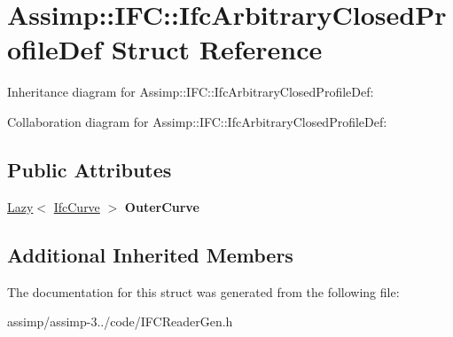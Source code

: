 \hypertarget{struct_assimp_1_1_i_f_c_1_1_ifc_arbitrary_closed_profile_def}{\section{Assimp\+:\+:I\+F\+C\+:\+:Ifc\+Arbitrary\+Closed\+Profile\+Def Struct Reference}
\label{struct_assimp_1_1_i_f_c_1_1_ifc_arbitrary_closed_profile_def}
}


Inheritance diagram for Assimp\+:\+:I\+F\+C\+:\+:Ifc\+Arbitrary\+Closed\+Profile\+Def\+:


Collaboration diagram for Assimp\+:\+:I\+F\+C\+:\+:Ifc\+Arbitrary\+Closed\+Profile\+Def\+:
\subsection*{Public Attributes}
\begin{DoxyCompactItemize}
\item 
\hypertarget{struct_assimp_1_1_i_f_c_1_1_ifc_arbitrary_closed_profile_def_a5dd1001de23e9f35401980e2deace85f}{\hyperlink{struct_assimp_1_1_s_t_e_p_1_1_lazy}{Lazy}$<$ \hyperlink{struct_assimp_1_1_i_f_c_1_1_ifc_curve}{Ifc\+Curve} $>$ {\bfseries Outer\+Curve}}\label{struct_assimp_1_1_i_f_c_1_1_ifc_arbitrary_closed_profile_def_a5dd1001de23e9f35401980e2deace85f}

\end{DoxyCompactItemize}
\subsection*{Additional Inherited Members}


The documentation for this struct was generated from the following file\+:\begin{DoxyCompactItemize}
\item 
assimp/assimp-\/3../code/I\+F\+C\+Reader\+Gen.\+h\end{DoxyCompactItemize}
